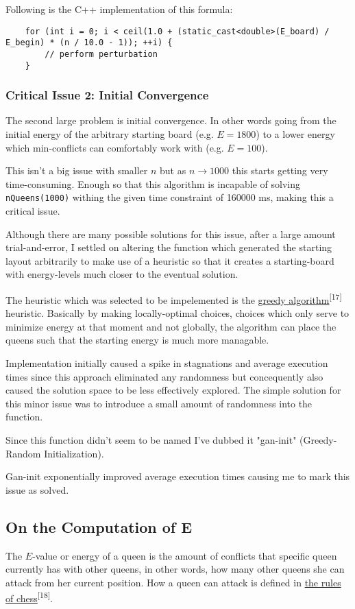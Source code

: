 \documentclass{article}
\begin{document}
Following is the C++ implementation of this formula:

\begin{lstlisting}
    for (int i = 0; i < ceil(1.0 + (static_cast<double>(E_board) / E_begin) * (n / 10.0 - 1)); ++i) {
        // perform perturbation
    }
\end{lstlisting}

\subsubsection{Critical Issue 2: Initial Convergence}
The second large problem is initial convergence. In other words going from the initial energy of the arbitrary starting board (e.g. $E=1800$)
to a lower energy which min-conflicts can comfortably work with (e.g. $E=100$).

This isn't a big issue with smaller $n$ but as $n \to 1000$ this starts getting very time-consuming.
Enough so that this algorithm is incapable of solving \texttt{nQueens(1000)} withing the given time constraint of 160000 ms, making this a critical issue.

Although there are many possible solutions for this issue, after a large amount trial-and-error,
I settled on altering the function which generated the starting layout arbitrarily to make use of a heuristic so that it creates
a starting-board with energy-levels much closer to the eventual solution.

The heuristic which was selected to be impelemented is the \href{https://en.wikipedia.org/wiki/Greedy_algorithm}{greedy algorithm}\textsuperscript{[17]} heuristic.
Basically by making locally-optimal choices, choices which only serve to minimize energy at that moment and not globally,
the algorithm can place the queens such that the starting energy is much more managable.

Implementation initially caused a spike in stagnations and average execution times since this approach eliminated any randomness
but concequently also caused the solution space to be less effectively explored. The simple solution for this minor issue was to introduce a small amount of randomness
into the function.

Since this function didn't seem to be named I've dubbed it "gan-init" (Greedy-Random Initialization).

Gan-init exponentially improved average execution times causing me to mark this issue as solved.

\subsection{On the Computation of E}
The $E$-value or energy of a queen is the amount of conflicts that specific queen currently has with other queens, in other words,
how many other queens she can attack from her current position. How a queen can attack is defined in
\href{https://en.wikipedia.org/wiki/Queen_(chess)\#Placement\_and\_movement}{the rules of chess}\textsuperscript{[18]}.
\end{document}

